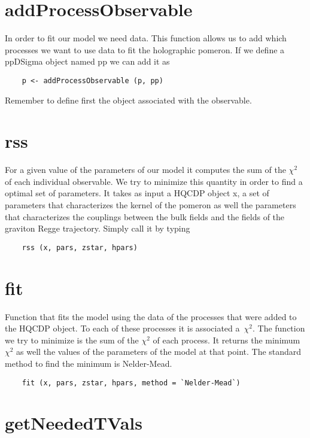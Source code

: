 \documentclass{book}
\begin{document}
\section{addProcessObservable}
In order to fit our model we need data. This function allows us to add which processes we want to use data to fit the holographic pomeron. If we define a ppDSigma object named pp we can add it as
\begin{lstlisting}
    p <- addProcessObservable (p, pp)
\end{lstlisting}
Remember to define first the object associated with the observable.

\section{rss}
For a given value of the parameters of our model it computes the sum of the $\chi^2$ of each individual observable. We try to minimize this quantity in order to find a optimal set of parameters. It takes as input a HQCDP object x, a set of parameters that characterizes the kernel of the pomeron as well the parameters that characterizes the couplings between the bulk fields and the fields of the graviton Regge trajectory. Simply call it by typing
\begin{lstlisting}
    rss (x, pars, zstar, hpars)
\end{lstlisting}

\section{fit}

Function that fits the model using the data of the processes that were added to the HQCDP object. To each of these processes it is associated a~$\chi^2$. The function we try to minimize is the sum of the $\chi^2$ of each process. It returns the minimum $\chi^2$ as well the values of the parameters of the model at that point. The standard method to find the minimum is Nelder-Mead.
\begin{lstlisting}
    fit (x, pars, zstar, hpars, method = `Nelder-Mead`)
\end{lstlisting}

\section{getNeededTVals}
\end{document}
